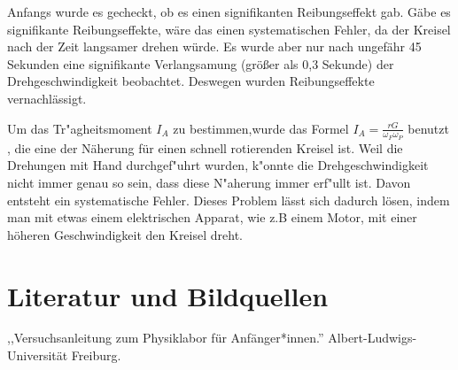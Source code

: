 \documentclass[11pt,a4paper]{article} %
\begin{document}
Anfangs wurde es gecheckt, ob es einen signifikanten Reibungseffekt gab. Gäbe es signifikante Reibungseffekte, wäre das einen systematischen Fehler, da der Kreisel nach der Zeit langsamer drehen würde. Es wurde aber nur nach ungefähr 45 Sekunden eine signifikante Verlangsamung (größer als 0,3 Sekunde) der Drehgeschwindigkeit beobachtet. Deswegen wurden Reibungseffekte vernachlässigt. 

Um das Tr"agheitsmoment $I_{A}$ zu bestimmen,wurde das Formel
$I_A = \frac{rG}{\omega_F \omega_P}$ benutzt , die eine der Näherung für einen schnell rotierenden Kreisel ist.
Weil die Drehungen mit Hand durchgef"uhrt wurden, k"onnte die Drehgeschwindigkeit nicht immer genau so sein, dass diese N"aherung immer erf"ullt ist. Davon entsteht ein systematische Fehler. Dieses Problem lässt sich dadurch lösen, indem man mit etwas einem elektrischen Apparat, wie z.B einem Motor, mit einer höheren Geschwindigkeit den Kreisel dreht.
\section{Literatur und Bildquellen}
,,Versuchsanleitung zum Physiklabor für Anfänger*innen.'' Albert-Ludwigs-Universität Freiburg. 
\end{document}
